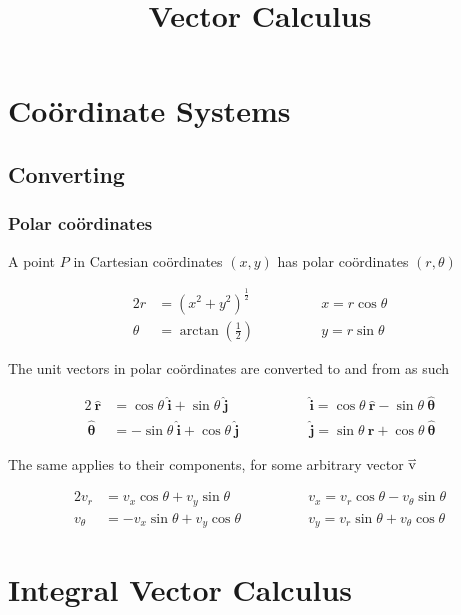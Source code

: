 \documentclass{article}
\title{Vector Calculus}
\date{}
\newcommand{\coords}{co{\"o}rdinates }
\newcommand{\ihat}{\ {\hat{\textbf{i}}}}
\newcommand{\jhat}{\ {\hat{\textbf{j}}}}
\newcommand{\rhat}{\ {\hat{\textbf{r}}}}
\newcommand{\that}{\ \boldsymbol{\hat{\theta}}}
\renewcommand{\vec}[1]{\accentset{\rightharpoonup}{\text{#1}}}
\theoremstyle{definition}
\begin{document}
\maketitle

\section{Co{\"o}rdinate Systems}

\subsection{Converting }

\subsubsection{Polar \coords}

A point $P$ in Cartesian \coords $(x, y)$ has polar \coords $(r, \theta)$  

\begin{alignat*}{2}
    r &= (x^2 + y^2)^{\frac{1}{2}} \qquad\qquad &x = r\cos \theta\\
    \theta &= \arctan\left(\frac{1}{2}\right) \qquad\qquad &y = r\sin \theta
\end{alignat*}

The unit vectors in polar \coords are converted to and from as such

\begin{alignat*}{2}
    \rhat&= \cos\theta\ihat + \sin\theta\jhat \qquad\qquad &\ihat = \cos\theta\rhat - \sin\theta\that\\
    \that &= -\sin\theta\ihat + \cos\theta\jhat \qquad\qquad &\jhat = \sin\theta\rhat + \cos\theta\that
\end{alignat*}

The same applies to their components, for some arbitrary vector $\vec{v}$

\begin{alignat*}{2}
    v_r &= v_x\cos\theta + v_y\sin\theta \qquad\qquad &v_x = v_r\cos\theta - v_\theta\sin\theta\\
    v_\theta &= -v_x\sin\theta + v_y\cos\theta \qquad\qquad &v_y = v_r\sin\theta + v_\theta\cos\theta
\end{alignat*}

\section{Integral Vector Calculus}
\end{document}
